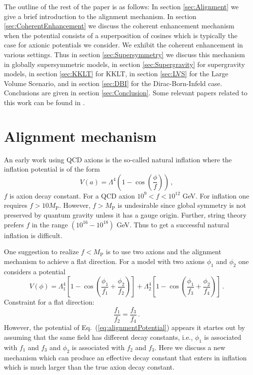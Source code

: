 \documentclass[12pt]{article}
\begin{document}
The outline of the rest of the paper is as follows: In section \ref{sec:Alignment} we give a brief introduction to the alignment mechanism.
In section \ref{sec:CoherentEnhancement} we discuss the coherent enhancement mechanism when the potential consists of a superposition of cosines which is typically the case for axionic potentials we consider.
We exhibit the coherent enhancement in various settings.
Thus in section \ref{sec:Supersymmetry} we discuss this mechanism in globally supersymmetric models, in section \ref{sec:Supergravity} for supergravity models, in section \ref{sec:KKLT} for KKLT, in section \ref{sec:LVS} for the Large Volume Scenario, and in section \ref{sec:DBI} for the Dirac-Born-Infeld case.
Conclusions are given in section \ref{sec:Conclusion}.
Some relevant papers related to this work can be found in \cite{BlancoPillado:2006he, Conlon:2005jm, Ben-Dayan:2014lca, Gao:2014uha}.

\section{Alignment mechanism \label{sec:Alignment}}
An early work using QCD axions is the so-called natural inflation where the inflation potential is of the form
\begin{equation} \label{eq:naturalInflationPotential}
  V(a) = \Lambda^4 \left(1 - \cos(\frac{\phi}{f})\right)\,,
\end{equation}
$f$ is axion decay constant.
For a QCD axion $10^9 < f < 10^{12}$ GeV.
For inflation one requires $f > 10 M_\text{P}$.
However, $f > M_\text{P}$ is undesirable since global symmetry is not preserved by quantum gravity unless it has a gauge origin.
Further, string theory prefers $f$ in the range $\left(10^{16} - 10^{18}\right)$ GeV.
Thus to get a successful natural inflation is difficult.

One suggestion to realize $f < M_\text{P}$ is to use two axions and the alignment mechanism to achieve a flat direction.
For a model with two axions $\phi_1$ and $\phi_2$ one considers a potential
\begin{equation} \label{eq:alignmentPotential}
  V(\phi)
    = \Lambda^4_1 \left[1 - \cos\left(\frac{\phi_1}{f_1} + \frac{\phi_2}{f_2}\right)\right]
    + \Lambda^4_2 \left[1 - \cos\left(\frac{\phi_1}{f_3} + \frac{\phi_2}{f_4}\right)\right]\,.
\end{equation}
Constraint for a flat direction:
\begin{equation}
  \frac{f_1}{f_2} = \frac{f_3}{f_4}\,.
\end{equation}
However, the potential of Eq.~(\ref{eq:alignmentPotential}) appears it startes out by assuming that the same field has different decay constants, i.e., $\phi_1$ is associated with $f_1$ and $f_3$ and $\phi_2$ is associated with $f_2$ and $f_3$.
Here we discuss a new mechanism which can produce an effective decay constant that enters in inflation which is much larger than the true axion decay constant.
\end{document}
